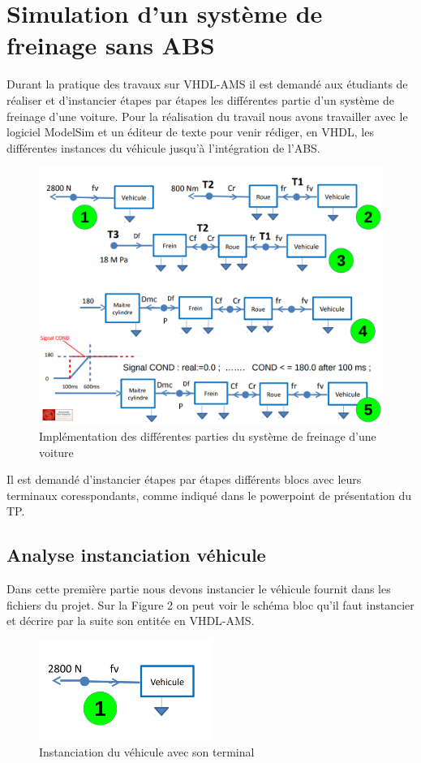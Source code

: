 \section{Simulation d'un système de freinage sans ABS}
Durant la pratique des travaux sur VHDL-AMS il est demandé aux étudiants de réaliser et d'instancier étapes par étapes les différentes partie d'un système de freinage d'une voiture. Pour la réalisation du travail nous avons travailler avec le logiciel ModelSim et un éditeur de texte pour venir rédiger, en VHDL, les différentes instances du véhicule jusqu'à l'intégration de l'ABS.

\begin{figure}[h]
    \centering
    \includegraphics[width=\textwidth]{images/etapes.png}
    \caption{Implémentation des différentes parties du système de freinage d'une voiture}
\end{figure}

Il est demandé d'instancier étapes par étapes différents blocs avec leurs terminaux coresspondants, comme indiqué dans le powerpoint de présentation du TP.

\newpage

\subsection{Analyse instanciation véhicule }
Dans cette première partie nous devons instancier le véhicule fournit dans les fichiers du projet. Sur la Figure 2 on peut voir le schéma bloc qu'il faut instancier et décrire par la suite son entitée en VHDL-AMS.

\begin{figure}[h]
    \centering
    \includegraphics[width=0.5\textwidth]{images/un.png}
    \caption{Instanciation du véhicule avec son terminal}
\end{figure}

